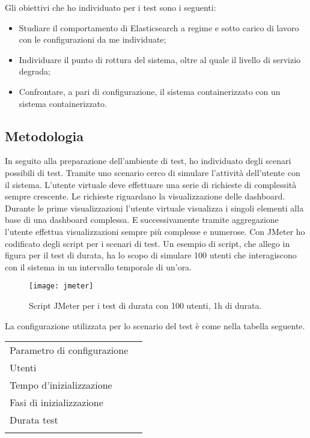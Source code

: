 Gli obiettivi che ho individuato per i test sono i seguenti:

\begin{itemize}
	\item Studiare il comportamento di Elasticsearch a regime e 
	      sotto carico di lavoro con le configurazioni da me individuate;      
	\item Individuare il punto di rottura del sistema, oltre al quale  
	      il livello di servizio degrada;
	\item Confrontare, a pari di configurazione, il sistema containerizzato 
		  con un sistema containerizzato.
\end{itemize}

\subsection{Metodologia}

In seguito alla preparazione dell'ambiente di test, 
ho individuato degli scenari possibili di test. 
Tramite uno scenario cerco di simulare l'attività 
dell'utente con il sistema. L'utente virtuale deve 
effettuare una serie di richieste di complessità sempre
crescente. Le richieste riguardano la visualizzazione 
delle dashboard. Durante le prime visualizzazioni
l'utente virtuale visualizza i singoli elementi 
alla base di una dashboard complessa. E successivamente 
tramite aggregazione l'utente effettua visualizzazioni
sempre più complesse e numerose.
Con JMeter ho codificato degli script per i scenari di test. 
Un esempio di script, che allego in figura per il test di durata, 
ha lo scopo di simulare 100 utenti che interagiscono con il sistema 
in un intervallo temporale di un'ora. 

\begin{figure}[htbp]
	\begin{center}
		\texttt{[image: jmeter]}
		\caption{Script JMeter per i test di durata con 100 utenti, 1h di durata.}
	\end{center}
\end{figure} 

La configurazione utilizzata per lo scenario del test 
è come nella tabella seguente.

\begin{center}
	\begin{tabular}
		{l||p{5cm}}	
		\arrayrulecolor{white}
		\rowcolor{glaucous}	
		Parametro di configurazione &  
		\makebox[5cm][c]{Valore} \\
		\rowcolor{lightcornflowerblue}
		Utenti & 
		\makebox[5cm][c]{100} \\
		\rowcolor{moonstoneblue}
		Tempo d'inizializzazione & 
		\makebox[5cm][c]{20 minuti} \\
		\rowcolor{lightcornflowerblue}
		Fasi di inizializzazione & 
		\makebox[5cm][c]{10}  \\
		\rowcolor{moonstoneblue}
		Durata test & 
		\makebox[5cm][c]{60 minuti}\\ 
		\rowcolor{lightcornflowerblue}
	\end{tabular}		  
\end{center}

